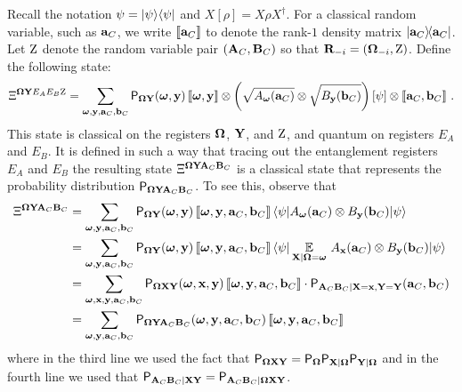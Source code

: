 Recall the notation $\psi = \ket{\psi}\bra{\psi}$ and $X[\rho]=X\rho X^\dagger$. For a classical random variable, such as $\ba_C$, we write $\puretomixed{\ba_C}$ to denote the rank-$1$ density matrix $\ketbra{\ba_C}{\ba_C}$. Let $\ac$ denote the random variable pair $(\bA_C, \bB_C)$ so that $\bR_\mi = (\bOmega_\mi,\ac)$. Define the following state:
\[
\Xi^{\bOmega \bY E_AE_B\ac} = \sum_{\bomega, \by, \ba_C, \bb_C} \P_{\bOmega \bY} (\bomega, \by) \, \puretomixed{\bomega, \by}   \otimes \left (\sqrt{A_{\bomega}(\ba_C)} \otimes \sqrt{B_{\by}(\bb_C)} \right ) \left [\psi \right ] \otimes \puretomixed{\ba_C, \bb_C}~.
\]
This state is classical on the registers $\bOmega$, $\bY$, and $\ac$, and quantum on registers $E_A$ and $E_B$. %
It is defined in such a way that tracing out the entanglement registers $E_A$ and $E_B$ the resulting state $\Xi^{\bOmega \bY \bA_C \bB_C}$ is a classical state that represents the probability distribution $\P_{\bOmega \bY \bA_C \bB_C}$. To see this, observe that
\begin{align*}
\Xi^{\bOmega \bY \bA_C \bB_C} &= \sum_{\bomega, \by, \ba_C, \bb_C} \P_{\bOmega \bY}(\bomega, \by) \, \puretomixed{\bomega, \by, \ba_C, \bb_C} \, \bra{\psi} A_\bomega(\ba_C) \otimes B_\by(\bb_C) \ket{\psi} \\
&= \sum_{\bomega, \by, \ba_C, \bb_C} \P_{\bOmega \bY}(\bomega, \by) \, \puretomixed{\bomega, \by, \ba_C, \bb_C} \, \bra{\psi} \Ex_{\bX | \bOmega = \bomega} \, A_\bx(\ba_C)  \otimes B_\by(\bb_C) \ket{\psi} \\
&= \sum_{\bomega, \bx, \by, \ba_C, \bb_C} \P_{\bOmega \bX \bY}(\bomega, \bx, \by) \, \puretomixed{\bomega, \by, \ba_C, \bb_C} \cdot \P_{\bA_C \bB_C | \bX = \bx, \bY = \bY}(\ba_C,\bb_C) \\
&= \sum_{\bomega,\by, \ba_C, \bb_C} \P_{\bOmega\bY \bA_C \bB_C}(\bomega, \by, \ba_C,\bb_C) \, \puretomixed{\bomega, \by, \ba_C, \bb_C}
\end{align*}
where in the third line we used the fact that $\P_{\bOmega \bX \bY} = \P_{\bOmega} \P_{\bX | \bOmega} \P_{\bY | \bOmega}$ and in the fourth line we used that $\P_{\bA_C \bB_C | \bX \bY} = \P_{\bA_C \bB_C | \bOmega \bX \bY}$. 

